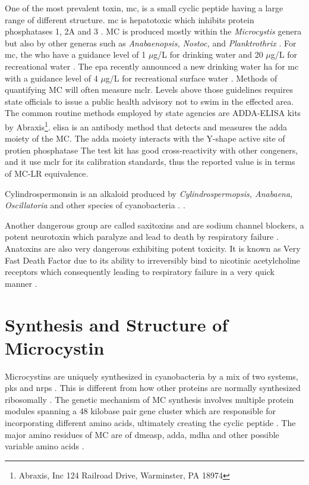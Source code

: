 One of the most prevalent toxin, \gls{mc}, is a small cyclic peptide having a large range of different structure. \gls{mc} is hepatotoxic which inhibits protein phosphatases 1, 2A and 3 \cite{moore_richard_cyanobacterial_1993}. MC is produced mostly within the \emph{Microcystis} genera but also by other generas such as \emph{Anabaenopsis,  Nostoc,} and \emph{Planktrothrix} \cite{rastogi_cyanotoxin-microcystins:_2014, davis_phylogenies_2014}. For \gls{mc}, the \gls{who} have a guidance level of 1 $\mu$g/L for drinking water and 20 $\mu$g/L for recreational water \cite{noauthor_guidelines_1998,noauthor_guidelines_2003}. The \gls{epa} recently announced a new drinking water \gls{ha} for \gls{mc} with a guidance level of 4 $\mu$g/L for recreational surface water \cite{usepa_draft_2016}. Methods of quantifying MC will often measure \gls{mclr}. Levels above those guidelines requires state officials to issue a public health advisory not to swim in the effected area.  The common routine methods employed by state agencies are ADDA-ELISA kits by Abraxis\footnote{Abraxis, Inc 124 Railroad Drive, Warminster, PA 18974}. \gls{elisa} is an antibody method that detects and measures the \gls{adda} moiety of the MC. The \gls{adda} moiety interacts with the Y-shape active site of protien phosphatase \cite{pereira_computational_2013} The test kit has good cross-reactivity with other congeners, and it use \gls{mclr} for its calibration standards, thus the reported value is in terms of MC-LR equivalence. 

Cylindrospermonsin is an alkaloid produced by \emph{Cylindrospermopsis, Anabaena, Oscillatoria} and other species of cyanobacteria \cite{dittmann_cyanobacterial_2012}.    \cite{usepa_draft_2016}.

Another dangerous group are called saxitoxins and are sodium channel blockers, a potent neurotoxin which paralyze and lead to death by respiratory failure \cite{moore_richard_cyanobacterial_1993}.  Anatoxins are also very dangerous exhibiting potent toxicity. It is known as Very Fast Death Factor due to its ability to irreversibly bind to nicotinic acetylcholine receptors which consequently leading to respiratory failure in a very quick manner \cite{codd_cyanobacterial_1999, moore_richard_cyanobacterial_1993}. 

\section{Synthesis and Structure of Microcystin}
Microcystins are uniquely synthesized in cyanobacteria by a mix of two systems, \gls{pks} and  \gls{nrps} \cite{tillett_structural_2000}. This is different from how other proteins are normally synthesized ribosomally . The genetic mechanism of MC synthesis involves multiple protein modules spanning a 48 kilobase pair gene cluster which are responsible for incorporating different amino acids, ultimately creating the cyclic peptide \cite{moffitt_characterization_2004,nishizawa_genetic_1999}. The major amino residues of MC  are of \gls{dmeasp}, \gls{adda},  \gls{mdha} and other possible variable amino acids \cite{trogen_conformational_1996,nishizawa_genetic_1999}.

